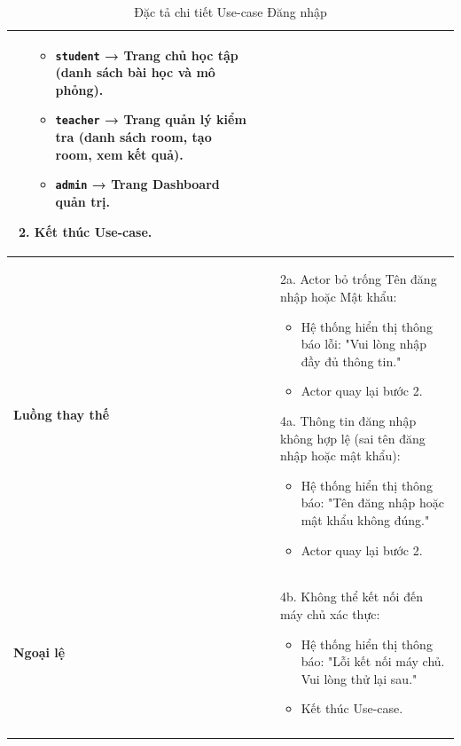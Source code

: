 \begin{longtable}{|p{}|p{}|}
\begin{enumerate}[topsep=2pt, itemsep=0pt]
\begin{itemize}[topsep=0pt, itemsep=0pt]
        \item \texttt{student} → Trang chủ học tập (danh sách bài học và mô phỏng).
        \item \texttt{teacher} → Trang quản lý kiểm tra (danh sách room, tạo room, xem kết quả).
        \item \texttt{admin} → Trang Dashboard quản trị.
    \end{itemize}
    \item Kết thúc Use-case.
\end{enumerate} \\
\hline
\textbf{Luồng thay thế} &
\vspace{-\baselineskip}
\begin{enumerate}[topsep=2pt, itemsep=0pt]
    \item[2a.] Actor bỏ trống Tên đăng nhập hoặc Mật khẩu:
    \begin{itemize}[topsep=0pt, itemsep=0pt]
        \item Hệ thống hiển thị thông báo lỗi: "Vui lòng nhập đầy đủ thông tin."
        \item Actor quay lại bước 2.
    \end{itemize}
    \item[4a.] Thông tin đăng nhập không hợp lệ (sai tên đăng nhập hoặc mật khẩu):
    \begin{itemize}[topsep=0pt, itemsep=0pt]
        \item Hệ thống hiển thị thông báo: "Tên đăng nhập hoặc mật khẩu không đúng."
        \item Actor quay lại bước 2.
    \end{itemize}
\end{enumerate} \\
\hline
\textbf{Ngoại lệ} &
\vspace{-\baselineskip}
\begin{enumerate}[topsep=2pt, itemsep=0pt]
    \item[4b.] Không thể kết nối đến máy chủ xác thực:
    \begin{itemize}[topsep=0pt, itemsep=0pt]
        \item Hệ thống hiển thị thông báo: "Lỗi kết nối máy chủ. Vui lòng thử lại sau."
        \item Kết thúc Use-case.
    \end{itemize}
\end{enumerate} \\
\hline
\caption{Đặc tả chi tiết Use-case Đăng nhập}
\label{table:uc-login}
\end{longtable}

